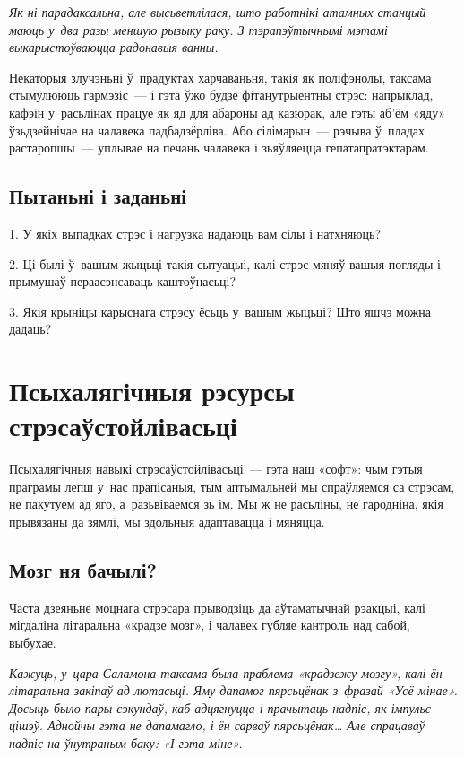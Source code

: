 \emph{Як ні парадаксальна, але высьветлілася, што работнікі атамных станцый маюць у~два разы меншую рызыку раку. З тэрапэўтычнымі мэтамі выкарыстоўваюцца радонавыя ванны.}

Некаторыя злучэньні ў~прадуктах харчаваньня, такія як поліфэнолы, таксама стымулююць гармэзіс~--- і гэта ўжо будзе фітанутрыентны стрэс: напрыклад, кафэін у~расьлінах працуе як яд для абароны ад казюрак, але гэты аб'ём «яду» ўзьдзейнічае на чалавека падбадзёрліва. Або сілімарын~--- рэчыва ў~пладах растаропшы~--- уплывае на печань чалавека і зьяўляецца гепатапратэктарам.

\subsection*{Пытаньні і заданьні}

1. У якіх выпадках стрэс і нагрузка надаюць вам сілы і натхняюць?

2. Ці былі ў~вашым жыцьці такія сытуацыі, калі стрэс мяняў вашыя погляды і прымушаў пераасэнсаваць каштоўнасьці?

3. Якія крыніцы карыснага стрэсу ёсьць у~вашым жыцьці? Што яшчэ можна дадаць?


\section{Псыхалягічныя рэсурсы стрэсаўстойлівасьці}

Псыхалягічныя навыкі стрэсаўстойлівасьці~--- гэта наш «софт»: чым гэтыя праграмы лепш у~нас прапісаныя, тым аптымальней мы спраўляемся са стрэсам, не пакутуем ад яго, а~разьвіваемся зь ім. Мы ж не расьліны, не гародніна, якія прывязаны да зямлі, мы здольныя адаптавацца і мяняцца.

\subsection*{Мозг ня бачылі?}

Часта дзеяньне моцнага стрэсара прыводзіць да аўтаматычнай рэакцыі, калі мігдаліна літаральна «крадзе мозг», і чалавек губляе кантроль над сабой, выбухае.

\emph{Кажуць, у~цара Саламона таксама была праблема «крадзежу мозгу», калі ён літаральна закіпаў ад лютасьці. Яму дапамог пярсьцёнак з~фразай «Усё мінае». Досыць было пары сэкундаў, каб адцягнуцца і прачытаць надпіс, як імпульс цішэў. Аднойчы гэта не дапамагло, і ён сарваў пярсьцёнак… Але спрацаваў надпіс на ўнутраным баку: «І гэта міне».}

